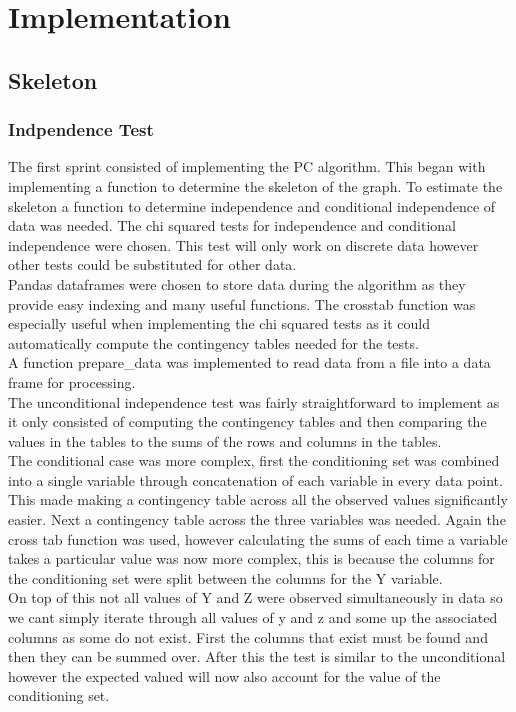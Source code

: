 \documentclass{article}
\begin{document}
\section{Implementation}
\subsection{Skeleton}
\subsubsection{Indpendence Test}
The first sprint consisted of implementing the PC algorithm. This began with implementing a function to determine the skeleton of the graph. To estimate the skeleton a function to determine independence and conditional independence of data was needed. The chi squared tests for independence and conditional independence were chosen. This test will only work on discrete data however other tests could be substituted for other data.
\\

Pandas dataframes were chosen to store data during the algorithm as they provide easy indexing and many useful functions. The crosstab function was especially useful when implementing the chi squared tests as it could automatically compute the contingency tables needed for the tests.
\\

A function prepare\_data was implemented to read data from a file into a data frame for processing.\\

The unconditional independence test was fairly straightforward to implement as it only consisted of computing the contingency tables and then comparing the values in the tables to the sums of the rows and columns in the tables.\\

The conditional case was more complex, first the conditioning set was combined into a single variable through concatenation of each variable in every data point. This made making a contingency table across all the observed values significantly easier. Next a contingency table across the three variables was needed. Again the cross tab function was used, however calculating the sums of each time a variable takes a particular value was now more complex, this is because the columns for the conditioning set were split between the columns for the Y variable.\\

On top of this not all values of Y and Z were observed simultaneously in data so
we cant simply iterate through all values of y and z and some up the associated columns as some do not exist. First the columns that exist must be found and then they can be summed over. After this the test is similar to the unconditional however the expected valued will now also account for the value of the conditioning set.
\\
\end{document}
